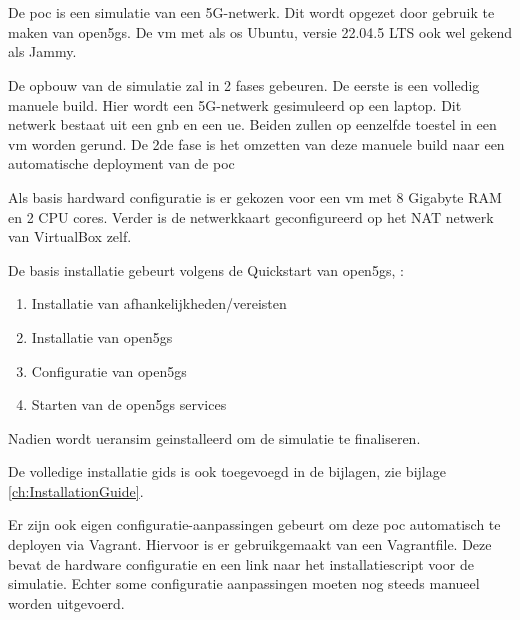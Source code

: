 \chapter{}%
\label{ch:poc1}

De \gls{poc} is een simulatie van een 5G-netwerk. Dit wordt opgezet door gebruik te maken van \gls{open5gs}. De \gls{vm} met als \gls{os} Ubuntu, versie 22.04.5 LTS ook wel gekend als Jammy. 

De opbouw van de simulatie zal in 2 fases gebeuren. De eerste is een volledig manuele build. Hier wordt een 5G-netwerk gesimuleerd op een laptop. Dit netwerk bestaat uit een \gls{gnb} en een \gls{ue}. Beiden zullen op eenzelfde toestel in een \gls{vm} worden gerund. De 2de fase is het omzetten van deze manuele build naar een automatische deployment van de \gls{poc}

Als basis hardward configuratie is er gekozen voor een \gls{vm} met 8 Gigabyte RAM en 2 CPU cores. Verder is de netwerkkaart geconfigureerd op het NAT netwerk van VirtualBox zelf.

De basis installatie gebeurt volgens de Quickstart van \gls{open5gs}, \textcite{Lee2025a}:

\begin{enumerate}
    \item Installatie van afhankelijkheden/vereisten
    \item Installatie van \gls{open5gs}
    \item Configuratie van \gls{open5gs}
    \item Starten van de \gls{open5gs} services
\end{enumerate}

Nadien wordt \gls{ueransim} geinstalleerd om de simulatie te finaliseren. 

De volledige installatie gids is ook toegevoegd in de bijlagen, zie bijlage \ref{ch:InstallationGuide}.

Er zijn ook eigen configuratie-aanpassingen gebeurt om deze \gls{poc} automatisch te deployen via Vagrant. Hiervoor is er gebruikgemaakt van een Vagrantfile. Deze bevat de hardware configuratie en een link naar het installatiescript voor de simulatie. Echter some configuratie aanpassingen moeten nog steeds manueel worden uitgevoerd.

